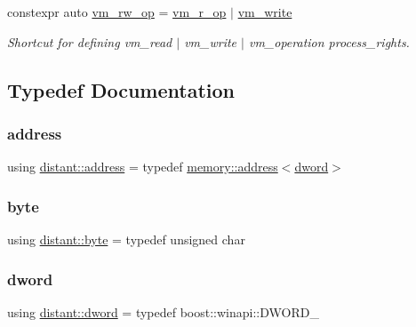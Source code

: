 \begin{DoxyCompactItemize}
constexpr auto \mbox{\hyperlink{namespacedistant_a2548084ad7c93b3e70d1f9e3d3f3cb2c}{vm\+\_\+rw\+\_\+op}} = \mbox{\hyperlink{namespacedistant_a22f555d49d1219029220e53628459768}{vm\+\_\+r\+\_\+op}} $\vert$ \mbox{\hyperlink{namespacedistant_a615d59c8cd8088e5d008fe35512e6d5e}{vm\+\_\+write}}
\begin{DoxyCompactList}\small\item\em Shortcut for defining vm\+\_\+read $\vert$ vm\+\_\+write $\vert$ vm\+\_\+operation process\+\_\+rights. \end{DoxyCompactList}\end{DoxyCompactItemize}


\subsection{Typedef Documentation}
\mbox{\label{namespacedistant_a9d7aa6e07cb2f50321e29c209f9a7886}} 
\subsubsection{\texorpdfstring{address}{address}}
{\footnotesize\ttfamily using \mbox{\hyperlink{namespacedistant_a9d7aa6e07cb2f50321e29c209f9a7886}{distant\+::address}} = typedef \mbox{\hyperlink{classdistant_1_1memory_1_1address}{memory\+::address}}$<$\mbox{\hyperlink{namespacedistant_a9fa41a5a1a17dcbd24da1c1855c92489}{dword}}$>$}

\mbox{\label{namespacedistant_af9c3f04a9b855a1368d6c1a9ce28c2f4}} 
\subsubsection{\texorpdfstring{byte}{byte}}
{\footnotesize\ttfamily using \mbox{\hyperlink{namespacedistant_af9c3f04a9b855a1368d6c1a9ce28c2f4}{distant\+::byte}} = typedef unsigned char}

\mbox{\label{namespacedistant_a9fa41a5a1a17dcbd24da1c1855c92489}} 
\subsubsection{\texorpdfstring{dword}{dword}}
{\footnotesize\ttfamily using \mbox{\hyperlink{namespacedistant_a9fa41a5a1a17dcbd24da1c1855c92489}{distant\+::dword}} = typedef boost\+::winapi\+::\+D\+W\+O\+R\+D\+\_\+}

